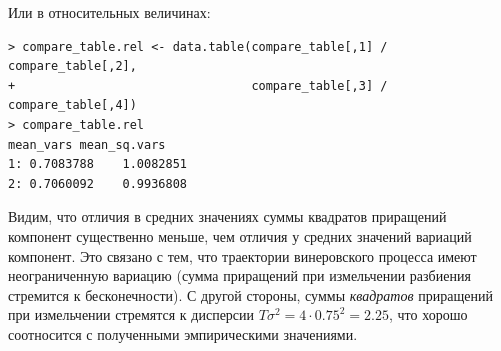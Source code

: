 \documentclass[14pt,a4paper]{scrartcl}
\begin{document}
Или в относительных величинах:

\begin{verbatim}
> compare_table.rel <- data.table(compare_table[,1] / compare_table[,2],
+                                 compare_table[,3] / compare_table[,4])
> compare_table.rel
mean_vars mean_sq.vars
1: 0.7083788    1.0082851
2: 0.7060092    0.9936808
\end{verbatim}

Видим, что отличия в средних значениях суммы квадратов приращений компонент существенно меньше, чем отличия у средних значений вариаций компонент. Это связано с тем, что траектории винеровского процесса имеют неограниченную вариацию (сумма приращений при измельчении разбиения стремится к бесконечности). С другой стороны, суммы \textit{квадратов} приращений при измельчении стремятся к дисперсии $T\sigma^2 = 4 \cdot 0.75^2 = 2.25$, что хорошо соотносится с полученными эмпирическими значениями.
\end{document}
